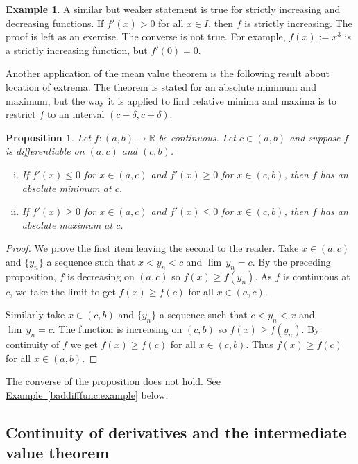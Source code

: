 \documentclass[12pt]{book}
\newcommand{\R}{{\mathbb{R}}}
\theoremstyle{plain}
\newtheorem{prop}[thm]{Proposition}
\theoremstyle{remark}
\theoremstyle{definition}
\theoremstyle{exercise}
\theoremstyle{example}
\newtheorem{example}[thm]{Example}
\newcommand{\exampleref}[1]{\hyperref[#1]{Example~\ref*{#1}}}
\begin{document}
\begin{example}
A similar but weaker statement is true for strictly increasing and
decreasing functions.  If $f'(x) > 0$ for all $x \in I$, then
$f$ is strictly increasing.  The proof is left as an exercise.
The converse is not true.  For example,
$f(x) := x^3$ is a strictly increasing function, but $f'(0) = 0$.
\end{example}

Another application of the \hyperref[thm:mvt]{mean value theorem} is the following result about
location of extrema.  The theorem is stated for an absolute minimum and
maximum, but the way it is applied to find relative minima
and maxima is to restrict $f$ to an interval $(c-\delta,c+\delta)$.

\begin{prop} \label{firstderminmaxtest}
Let $f \colon (a,b) \to \R$ be continuous.  Let $c \in (a,b)$
and suppose
$f$ is differentiable on $(a,c)$ and $(c,b)$.
\begin{enumerate}[(i)]
\item If $f'(x) \leq 0$ for $x \in (a,c)$ and
 $f'(x) \geq 0$ for $x \in (c,b)$, then $f$ has an absolute minimum 
at $c$.
\item If $f'(x) \geq 0$ for $x \in (a,c)$ and
 $f'(x) \leq 0$ for $x \in (c,b)$, then $f$ has an absolute maximum
at $c$.
\end{enumerate}
\end{prop}

\begin{proof}
We prove the first item leaving the second to the reader.
Take $x \in (a,c)$
and $\{ y_n\}$ a sequence such that $x < y_n < c$ and $\lim\, y_n = c$.
By the preceding proposition,
$f$ is decreasing on $(a,c)$ so $f(x) \geq f(y_n)$.
As $f$ is
continuous at $c$, we take the limit to get
$f(x) \geq f(c)$ for all $x \in (a,c)$.

Similarly take $x \in (c,b)$
and $\{ y_n\}$ a sequence such that $c < y_n < x$ and $\lim\, y_n = c$.
The function is increasing on $(c,b)$ so $f(x) \geq f(y_n)$.
By continuity of $f$ we get
$f(x) \geq f(c)$ for all $x \in (c,b)$.  Thus $f(x) \geq f(c)$ for all
$x \in (a,b)$.
\end{proof}

The converse of the proposition does not hold.  See
\exampleref{baddifffunc:example} below.

\subsection{Continuity of derivatives and the intermediate value theorem}
\end{document}

